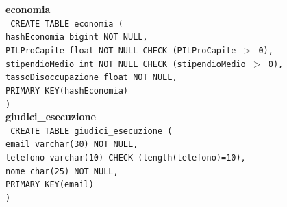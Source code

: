 \documentclass[a4paper,12pt]{report}
\begin{document}
                \noindent
                {\large \textbf{economia}} \\
                \texttt{
                    CREATE TABLE economia ( \\
                    \null\quad\quad hashEconomia bigint NOT NULL, \\
                    \null\quad\quad PILProCapite            float   NOT NULL CHECK (PILProCapite $>$ 0), \\
                    \null\quad\quad stipendioMedio          int     NOT NULL CHECK (stipendioMedio $>$ 0), \\
                    \null\quad\quad tassoDisoccupazione     float   NOT NULL, \\
                    \null\quad\quad PRIMARY KEY(hashEconomia) \\
                    )
                } \\

                \noindent
                {\large \textbf{giudici\_esecuzione}} \\
                \texttt{
                    CREATE TABLE giudici\_esecuzione ( \\
                    \null\quad\quad email      varchar(30)     NOT NULL, \\
                    \null\quad\quad telefono    varchar(10)     CHECK (length(telefono)=10), \\
                    \null\quad\quad nome        char(25)    NOT NULL, \\
                    \null\quad\quad PRIMARY KEY(email) \\
                    )
                } \\
\end{document}
